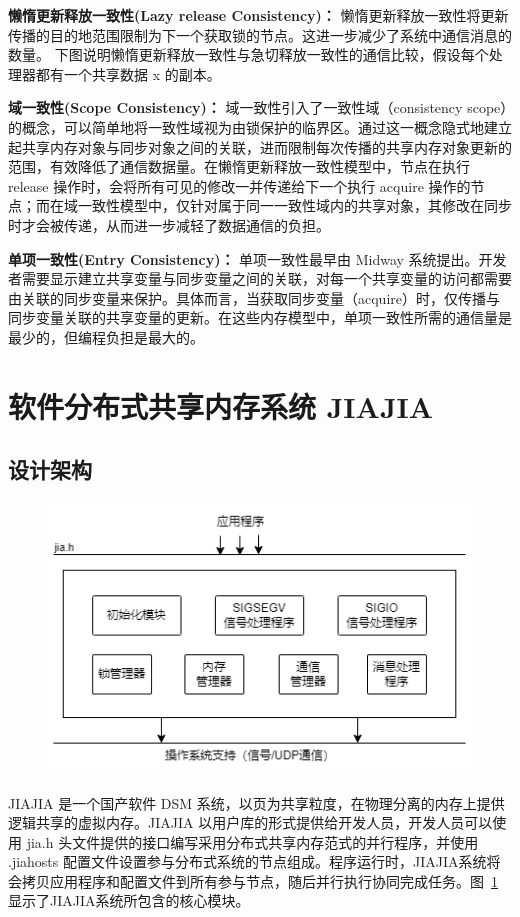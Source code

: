 {\textbf{懒惰更新释放一致性(Lazy release Consistency)：} 懒惰更新释放一致性将更新传播的目的地范围限制为下一个获取锁的节点。这进一步减少了系统中通信消息的数量。
下图说明懒惰更新释放一致性与急切释放一致性的通信比较，假设每个处理器都有一个共享数据 x 的副本。

\textbf{域一致性(Scope Consistency)：} 域一致性引入了一致性域（consistency scope）的概念，可以简单地将一致性域视为由锁保护的临界区。通过这一概念隐式地建立起共享内存对象与同步对象之间的关联，进而限制每次传播的共享内存对象更新的范围，有效降低了通信数据量。在懒惰更新释放一致性模型中，节点在执行 release 操作时，会将所有可见的修改一并传递给下一个执行 acquire 操作的节点；而在域一致性模型中，仅针对属于同一一致性域内的共享对象，其修改在同步时才会被传递，从而进一步减轻了数据通信的负担。

\textbf{单项一致性(Entry Consistency)：} 单项一致性最早由 Midway 系统提出。开发者需要显示建立共享变量与同步变量之间的关联，对每一个共享变量的访问都需要由关联的同步变量来保护。具体而言，当获取同步变量（acquire）时，仅传播与同步变量关联的共享变量的更新。在这些内存模型中，单项一致性所需的通信量是最少的，但编程负担是最大的。

\section{软件分布式共享内存系统 JIAJIA}
\subsection{设计架构}
\begin{figure}[!htbp]
    \centering
    \includegraphics[width=\textwidth]{Img/JIAJIA-design.png}
    \label{fig:JIAJIA-design}
\end{figure}
JIAJIA 是一个国产软件 DSM 系统，以页为共享粒度，在物理分离的内存上提供逻辑共享的虚拟内存。JIAJIA 以用户库的形式提供给开发人员，开发人员可以使用 jia.h 头文件提供的接口编写采用分布式共享内存范式的并行程序，并使用 .jiahosts 配置文件设置参与分布式系统的节点组成。程序运行时，JIAJIA系统将会拷贝应用程序和配置文件到所有参与节点，随后并行执行协同完成任务。图~\ref{fig:JIAJIA-design} 显示了JIAJIA系统所包含的核心模块。

}
